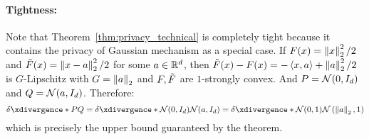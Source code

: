 \paragraph{Tightness:} Note that Theorem~\ref{thm:privacy_technical} is completely tight because it contains the privacy of Gaussian mechanism as a special case. If $F(x)=\left\lVert x\right\rVert_2^2/2$ and $\Tilde{F}(x)=\left\lVert x-a\right\rVert_2^2/2$ for some $a\in \mathbb{R}^d$, then $\Tilde{F}(x)-F(x)=-\left\langle x,a \right\rangle+\left\lVert a\right\rVert_2^2/2$ is $G$-Lipschitz with $G=\left\lVert a\right\rVert_2$ and $F,\Tilde{F}$ are $1$-strongly convex. And $P=\mathcal N(0,I_d)$ and $Q=\mathcal N(a,I_d)$. Therefore:
$$\deltacurve{P}{Q}=\deltacurve{\cN(0,I_d)}{\cN(a,I_d)}=\deltacurve{\cN(0,1)}{\cN\lp\norm{a}_2,1\rp}$$ which is precisely the upper bound guaranteed by the theorem.





